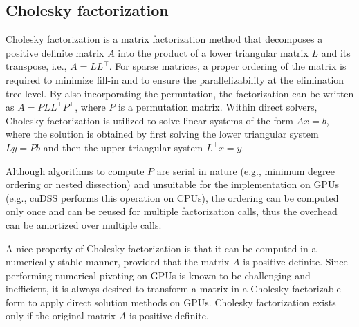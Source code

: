 \documentclass{article}
\begin{document}
\subsection{Cholesky factorization}
Cholesky factorization is a matrix factorization method that decomposes a positive definite matrix $A$ into the product of a lower triangular matrix $L$ and its transpose, i.e., $A = LL^\top$. For sparse matrices, a proper ordering of the matrix is required to minimize fill-in and to ensure the parallelizability at the elimination tree level. By also incorporating the permutation, the factorization can be written as $A = P L L^\top P^\top$, where $P$ is a permutation matrix.
Within direct solvers, Cholesky factorization is utilized to solve linear systems of the form $Ax = b$, where the solution is obtained by first solving the lower triangular system $Ly = Pb$ and then the upper triangular system $L^\top x = y$.

Although algorithms to compute $P$ are serial in nature (e.g., minimum degree ordering or nested dissection) and unsuitable for the implementation on GPUs (e.g., cuDSS performs this operation on CPUs), the ordering can be computed only once and can be reused for multiple factorization calls, thus the overhead can be amortized over multiple calls.

A nice property of Cholesky factorization is that it can be computed in a numerically stable manner, provided that the matrix $A$ is positive definite.
Since performing numerical pivoting on GPUs is known to be challenging and inefficient, it is always desired to transform a matrix in a Cholesky factorizable form to apply direct solution methods on GPUs.
Cholesky factorization exists only if the original matrix $A$ is positive definite.

\end{document}
